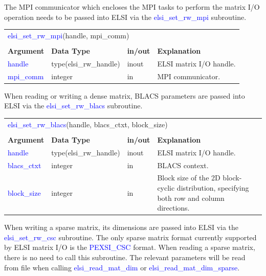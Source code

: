\documentclass{report}
\newcommand{\tcb}[1]{\textcolor{blue}{#1}}
\begin{document}
The MPI communicator which encloses the MPI tasks to perform the matrix I/O operation needs to be passed into ELSI via the \tcb{elsi\_set\_rw\_mpi} subroutine.

\begin{tabular}[]{|p{20mm}|p{45mm}|p{15mm}|p{85mm}|}
\multicolumn{4}{l}{\tcb{elsi\_set\_rw\_mpi}(handle, mpi\_comm)}\\
\multicolumn{4}{l}{}\\
\hline
\multicolumn{1}{|l|}{\textbf{Argument}} & \multicolumn{1}{l|}{\textbf{Data Type}} & \multicolumn{1}{l|}{\textbf{in/out}} & \multicolumn{1}{l|}{\textbf{Explanation}}\\
\hline
\tcb{handle}    & type(elsi\_rw\_handle) & inout & ELSI matrix I/O handle.\\
\hline
\tcb{mpi\_comm} & integer                & in    & MPI communicator.\\
\hline
\end{tabular}

When reading or writing a dense matrix, BLACS parameters are passed into ELSI via the \tcb{elsi\_set\_rw\_blacs} subroutine.

\begin{tabular}[]{|p{20mm}|p{45mm}|p{15mm}|p{85mm}|}
\multicolumn{4}{l}{\tcb{elsi\_set\_rw\_blacs}(handle, blacs\_ctxt, block\_size)}\\
\multicolumn{4}{l}{}\\
\hline
\multicolumn{1}{|l|}{\textbf{Argument}} & \multicolumn{1}{l|}{\textbf{Data Type}} & \multicolumn{1}{l|}{\textbf{in/out}} & \multicolumn{1}{l|}{\textbf{Explanation}}\\
\hline
\tcb{handle}      & type(elsi\_rw\_handle) & inout & ELSI matrix I/O handle.\\
\hline
\tcb{blacs\_ctxt} & integer                & in    & BLACS context.\\
\hline
\tcb{block\_size} & integer                & in    & Block size of the 2D block-cyclic distribution, specifying both row and column directions.\\
\hline
\end{tabular}

When writing a sparse matrix, its dimensions are passed into ELSI via the \tcb{elsi\_set\_rw\_csc} subroutine. The only sparse matrix format currently supported by ELSI matrix I/O is the \tcb{PEXSI\_CSC} format. When reading a sparse matrix, there is no need to call this subroutine. The relevant parameters will be read from file when calling \tcb{elsi\_read\_mat\_dim} or \tcb{elsi\_read\_mat\_dim\_sparse}.
\end{document}
